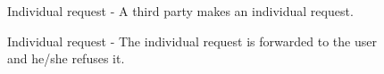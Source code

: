 \begin{figure}[ht]
    \caption{Individual request - A third party makes an individual request.}
    \label{RV3}
\end{figure}

\begin{figure}[ht]
    \caption{Individual request - The individual request is forwarded to the user and he/she refuses it.}
    \label{RV4}
\end{figure}

